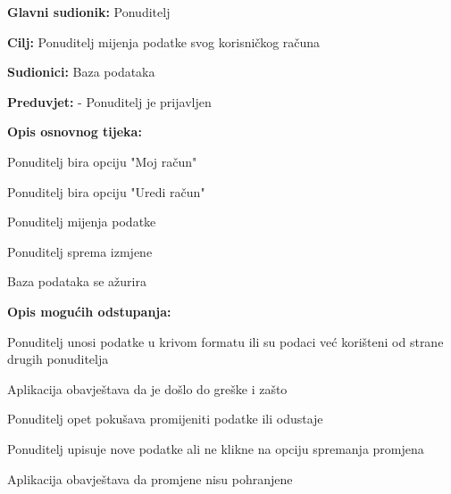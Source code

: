                     \noindent {}
					\begin{packed_item}
	
						\item \textbf{Glavni sudionik: } Ponuditelj
						\item  \textbf{Cilj:} Ponuditelj mijenja podatke svog korisničkog računa
						\item  \textbf{Sudionici:} Baza podataka
						\item  \textbf{Preduvjet:} - Ponuditelj je prijavljen
						\item  \textbf{Opis osnovnog tijeka:}
						
						\item[] \begin{packed_enum}
	
							\item Ponuditelj bira opciju "Moj račun"
							\item Ponuditelj bira opciju "Uredi račun"
	                            				\item Ponuditelj mijenja podatke
                            					\item Ponuditelj sprema izmjene
                            					\item Baza podataka se ažurira
						\end{packed_enum}
						
						\item  \textbf{Opis mogućih odstupanja:}
						
						\item[] \begin{packed_item}
	
							\item[2.a] Ponuditelj unosi podatke u krivom formatu ili su podaci već korišteni od strane drugih ponuditelja
							\item[] \begin{packed_enum}
								
								\item Aplikacija obavještava da je došlo do greške i zašto
								\item Ponuditelj opet pokušava promijeniti podatke ili odustaje
							\end{packed_enum}

                            					\item[2.b] Ponuditelj upisuje nove podatke ali ne klikne na opciju spremanja promjena
                            					\item[] \begin{packed_enum}
                                					\item Aplikacija obavještava da promjene nisu pohranjene
                            					\end{packed_enum}
						\end{packed_item}
					\end{packed_item}

